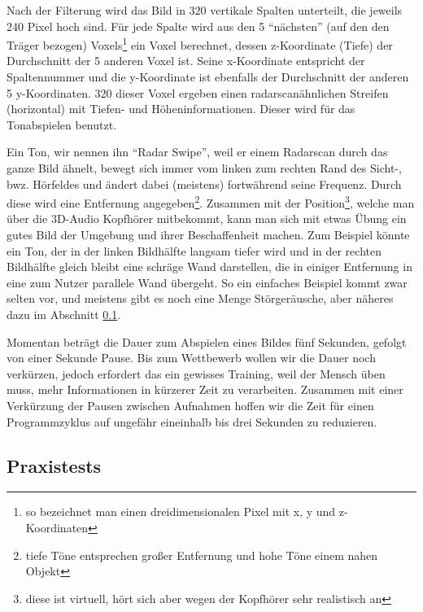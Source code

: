 \documentclass[a4paper,12pt,ngerman]{scrartcl}
\begin{document}
\par 
Nach der Filterung wird das Bild in 320 vertikale Spalten unterteilt, die jeweils 240 Pixel hoch sind. 
Für jede Spalte wird aus den 5 \enquote{nächsten} (auf den den Träger bezogen) Voxels\footnote{so bezeichnet man einen dreidimensionalen Pixel mit x, y und z-Koordinaten} ein Voxel berechnet,
dessen z-Koordinate (Tiefe) der Durchschnitt der 5 anderen Voxel ist. Seine x-Koordinate entspricht
der Spaltennummer und die y-Koordinate ist ebenfalls der Durchschnitt der anderen 5 y-Koordinaten. 
320 dieser Voxel ergeben einen radarscanähnlichen Streifen (horizontal) mit Tiefen- und 
Höheninformationen. Dieser wird für das Tonabspielen benutzt.\par 
Ein Ton, wir nennen ihn \enquote{Radar Swipe}, weil er einem Radarscan durch das ganze Bild ähnelt, 
bewegt sich immer vom linken zum rechten Rand des Sicht-, bwz. Hörfeldes und ändert dabei (meistens) fortwährend
seine Frequenz. Durch diese wird eine Entfernung angegeben\footnote{tiefe Töne entsprechen großer 
	Entfernung und hohe Töne einem nahen Objekt}. Zusammen mit der Position\footnote{diese ist virtuell,
	hört sich aber wegen der Kopfhörer sehr realistisch an}, welche man über
die 3D-Audio Kopfhörer mitbekommt, kann man sich mit etwas Übung ein gutes Bild der Umgebung und ihrer
Beschaffenheit machen. Zum Beispiel könnte ein Ton, der in der linken Bildhälfte langsam tiefer wird und 
in der rechten Bildhälfte gleich bleibt eine schräge Wand darstellen, die in einiger Entfernung in eine
zum Nutzer parallele Wand übergeht. So ein einfaches Beispiel kommt zwar selten vor, und meistens gibt es
noch eine Menge Störgeräusche, aber näheres dazu im Abschnitt \ref{testsAndResults}.\par 
Momentan beträgt die Dauer zum Abspielen eines Bildes fünf Sekunden, gefolgt von einer Sekunde 
Pause. Bis zum Wettbewerb wollen wir die Dauer noch verkürzen, jedoch erfordert das ein gewisses 
Training, weil der Mensch üben muss, mehr Informationen in kürzerer Zeit zu verarbeiten. Zusammen mit 
einer Verkürzung der Pausen zwischen Aufnahmen hoffen wir die Zeit für einen Programmzyklus auf ungefähr
eineinhalb bis drei Sekunden zu reduzieren. 

\subsection{Praxistests} \label{testsAndResults}
\end{document}
